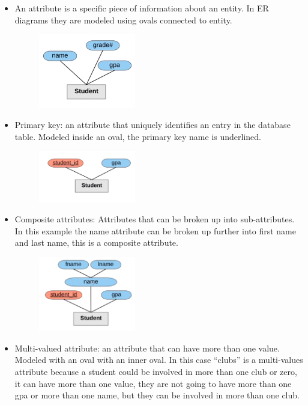\begin{itemize}
    \item An attribute is a specific piece of information about an entity. In ER diagrams they are modeled using ovals connected to entity.
        \begin{figure}[H]
            \centering
            \includegraphics[width=0.4\textwidth]{./Figs/2020-12-23-23-33-26.png}
        \end{figure}
    \item Primary key: an attribute that uniquely identifies an entry in the database table. Modeled inside an oval, the primary key name is underlined.
        \begin{figure}[H]
            \centering
            \includegraphics[width=0.4\textwidth]{./Figs/2020-12-23-23-33-54.png}
        \end{figure}
    \item Composite attributes: Attributes that can be broken up into sub-attributes. In this example the name attribute can be broken up further into first name and last name, this is a composite attribute.
        \begin{figure}[H]
            \centering
            \includegraphics[width=0.4\textwidth]{./Figs/2020-12-23-23-34-47.png}
        \end{figure}
    \item Multi-valued attribute: an attribute that can have more than one value. Modeled with an oval with an inner oval. In this case ``clubs'' is a multi-values attribute because a student could be involved in more than one club or zero, it can have more than one value, they are not going to have more than one gpa or more than one name, but they can be involved in more than one club.

\end{itemize}
